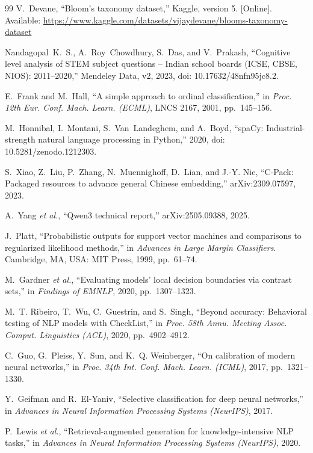 \documentclass[conference]{IEEEtran}
\begin{document}
\begin{thebibliography}{99}
V.~Devane, ``Bloom's taxonomy dataset,'' Kaggle, version 5. [Online]. Available:
\url{https://www.kaggle.com/datasets/vijaydevane/blooms-taxonomy-dataset}

Nandagopal~K.~S., A.~Roy~Chowdhury, S.~Das, and V.~Prakash, ``Cognitive level analysis of STEM
subject questions -- Indian school boards (ICSE, CBSE, NIOS): 2011--2020,'' Mendeley Data, v2,
2023, doi: 10.17632/48nfn95jc8.2.

E.~Frank and M.~Hall, ``A simple approach to ordinal classification,'' in \emph{Proc. 12th Eur.
Conf. Mach. Learn. (ECML)}, LNCS 2167, 2001, pp.~145--156.

M.~Honnibal, I.~Montani, S.~Van~Landeghem, and A.~Boyd, ``spaCy: Industrial-strength natural
language processing in Python,'' 2020, doi: 10.5281/zenodo.1212303.

S.~Xiao, Z.~Liu, P.~Zhang, N.~Muennighoff, D.~Lian, and J.-Y. Nie, ``C-Pack: Packaged resources
to advance general Chinese embedding,'' arXiv:2309.07597, 2023.

A.~Yang \emph{et al.}, ``Qwen3 technical report,'' arXiv:2505.09388, 2025.

J.~Platt, ``Probabilistic outputs for support vector machines and comparisons to regularized
likelihood methods,'' in \emph{Advances in Large Margin Classifiers}. Cambridge, MA, USA: MIT
Press, 1999, pp.~61--74.

M.~Gardner \emph{et al.}, ``Evaluating models' local decision boundaries via contrast sets,'' in
\emph{Findings of EMNLP}, 2020, pp.~1307--1323.

M.~T. Ribeiro, T.~Wu, C.~Guestrin, and S.~Singh, ``Beyond accuracy: Behavioral testing of NLP
models with CheckList,'' in \emph{Proc. 58th Annu. Meeting Assoc. Comput. Linguistics (ACL)},
2020, pp.~4902--4912.

C.~Guo, G.~Pleiss, Y.~Sun, and K.~Q. Weinberger, ``On calibration of modern neural networks,'' in
\emph{Proc. 34th Int. Conf. Mach. Learn. (ICML)}, 2017, pp.~1321--1330.

Y.~Geifman and R.~El-Yaniv, ``Selective classification for deep neural networks,'' in
\emph{Advances in Neural Information Processing Systems (NeurIPS)}, 2017.

P.~Lewis \emph{et al.}, ``Retrieval-augmented generation for knowledge-intensive NLP tasks,'' in
\emph{Advances in Neural Information Processing Systems (NeurIPS)}, 2020.


\end{thebibliography}
\end{document}
